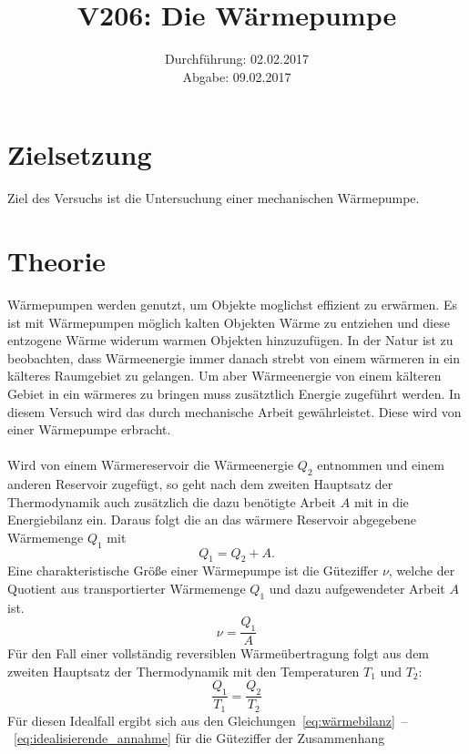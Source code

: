 \documentclass[
  bibliography=totoc,     %
  captions=tableheading,  %
  titlepage=firstiscover, %
]{scrartcl}
\title{V206: Die Wärmepumpe}
\author{
  Simon Schulte
  \texorpdfstring{
    \\
    \href{mailto:simon.schulte@udo.edu}{simon.schulte@udo.edu}
  }{}
  \texorpdfstring{\and}{, }
  Tim Sedlaczek
  \texorpdfstring{
    \\
    \href{mailto:tim.sedlaczek@udo.edu}{tim.sedlaczek@udo.edu}
  }{}
}
\date{Durchführung: 02.02.2017\\
      Abgabe: 09.02.2017}
\begin{document}
\maketitle
\thispagestyle{empty}
\tableofcontents
\newpage
\section{Zielsetzung}
\label{sec:zielsetzung}
Ziel des Versuchs ist die Untersuchung einer mechanischen Wärmepumpe.
\section{Theorie}
\label{sec:theorie}
Wärmepumpen werden genutzt, um Objekte moglichst effizient zu erwärmen.
Es ist mit Wärmepumpen möglich kalten Objekten Wärme zu entziehen und diese
entzogene Wärme widerum warmen Objekten hinzuzufügen. In der Natur ist zu
beobachten, dass Wärmeenergie immer danach strebt von einem wärmeren in ein
kälteres Raumgebiet zu gelangen. Um aber Wärmeenergie von einem kälteren Gebiet
in ein wärmeres zu bringen muss zusätztlich Energie zugeführt werden.
In diesem Versuch wird das durch mechanische Arbeit gewährleistet. Diese wird
von einer Wärmepumpe erbracht. \\
\\
Wird von einem Wärmereservoir die Wärmeenergie
$Q_2$ entnommen und einem anderen Reservoir zugefügt, so geht nach dem zweiten
Hauptsatz der Thermodynamik auch zusätzlich die dazu benötigte Arbeit $A$ mit
in die Energiebilanz ein. Daraus folgt die an das wärmere Reservoir abgegebene
Wärmemenge $Q_1$ mit
\begin{equation}
    Q_1=Q_2+A.
    \label{eq:wärmebilanz}
\end{equation}
Eine charakteristische Größe einer Wärmepumpe ist die Güteziffer $ν$, welche der
Quotient aus transportierter Wärmemenge $Q_1$ und dazu aufgewendeter Arbeit $A$
ist.
\begin{equation}
    \nu=\frac{Q_1}{A}
    \label{eq:güteziffer}
\end{equation}
Für den Fall einer vollständig reversiblen Wärmeübertragung folgt aus dem
zweiten Hauptsatz der Thermodynamik mit den Temperaturen $T_1$ und $T_2$:
\begin{equation}
    \frac{Q_1}{T_1}=\frac{Q_2}{T_2}
    \label{eq:idealisierende_annahme}
\end{equation}
Für diesen Idealfall ergibt sich aus den
Gleichungen~\eqref{eq:wärmebilanz}~--~\eqref{eq:idealisierende_annahme} für die
Güteziffer der Zusammenhang
\end{document}
